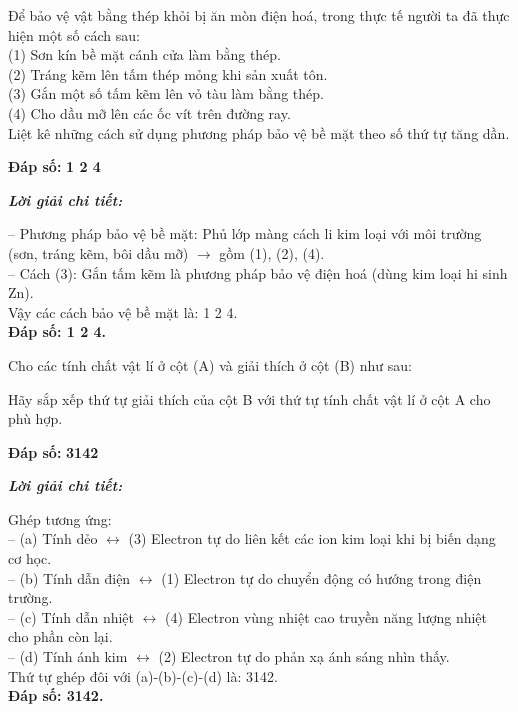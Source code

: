 \documentclass[11pt,a4paper]{article}
\def\loigiai#1{
\par\begingroup\color{blue!80!black}\small
\noindent\textbf{\textit{Lời giải chi tiết:}}\par
#1\par\endgroup}
\begin{document}
\begin{ex}
Để bảo vệ vật bằng thép khỏi bị ăn mòn điện hoá, trong thực tế người ta đã thực hiện một số cách sau:\\
(1) Sơn kín bề mặt cánh cửa làm bằng thép.\\
(2) Tráng kẽm lên tấm thép mỏng khi sản xuất tôn.\\
(3) Gắn một số tấm kẽm lên vỏ tàu làm bằng thép.\\
(4) Cho dầu mỡ lên các ốc vít trên đường ray.\\
Liệt kê những cách sử dụng phương pháp bảo vệ bề mặt theo số thứ tự tăng dần.
\par\noindent\textbf{Đáp số:} \textbf{\color{red}1 2 4}
\loigiai{
-- Phương pháp bảo vệ bề mặt: Phủ lớp màng cách li kim loại với môi trường (sơn, tráng kẽm, bôi dầu mỡ) $\rightarrow$ gồm (1), (2), (4).\\
-- Cách (3): Gắn tấm kẽm là phương pháp bảo vệ điện hoá (dùng kim loại hi sinh Zn).\\
Vậy các cách bảo vệ bề mặt là: 1 2 4.\\
\textbf{Đáp số: 1 2 4.}}
\end{ex}

\begin{ex}
Cho các tính chất vật lí ở cột (A) và giải thích ở cột (B) như sau:
\par{}\vspace{1pt}
Hãy sắp xếp thứ tự giải thích của cột B với thứ tự tính chất vật lí ở cột A cho phù hợp.
\par\noindent\textbf{Đáp số:} \textbf{\color{red}3142}
\loigiai{
Ghép tương ứng:\\
-- (a) Tính dẻo $\leftrightarrow$ (3) Electron tự do liên kết các ion kim loại khi bị biến dạng cơ học.\\
-- (b) Tính dẫn điện $\leftrightarrow$ (1) Electron tự do chuyển động có hướng trong điện trường.\\
-- (c) Tính dẫn nhiệt $\leftrightarrow$ (4) Electron vùng nhiệt cao truyền năng lượng nhiệt cho phần còn lại.\\
-- (d) Tính ánh kim $\leftrightarrow$ (2) Electron tự do phản xạ ánh sáng nhìn thấy.\\
Thứ tự ghép đôi với (a)-(b)-(c)-(d) là: 3142.\\
\textbf{Đáp số: 3142.}}
\end{ex}
\end{document}
